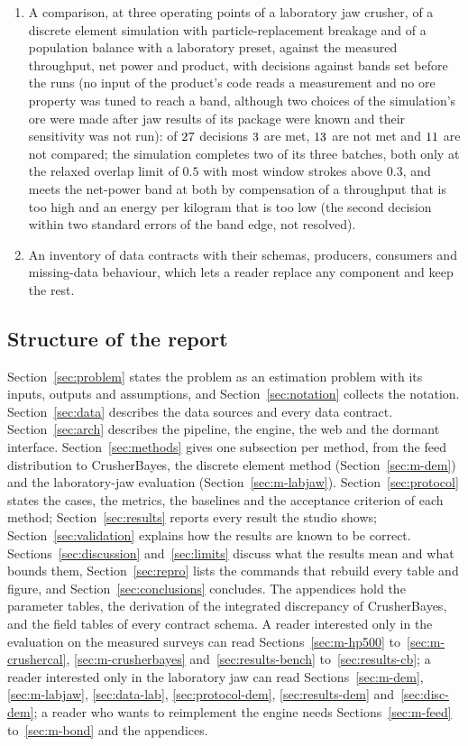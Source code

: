 \begin{enumerate}
\item A comparison, at three operating points of a laboratory jaw crusher, of a discrete element simulation with particle-replacement breakage and of a population balance with a laboratory preset, against the measured throughput, net power and product, with decisions against bands set before the runs (no input of the product's code reads a measurement and no ore property was tuned to reach a band, although two choices of the simulation's ore were made after jaw results of its package were known and their sensitivity was not run): of $27$ decisions $3$ are met, $13$ are not met and $11$ are not compared; the simulation completes two of its three batches, both only at the relaxed overlap limit of $0.5$ with most window strokes above $0.3$, and meets the net-power band at both by compensation of a throughput that is too high and an energy per kilogram that is too low (the second decision within two standard errors of the band edge, not resolved).
\item An inventory of \ncontracts{} data contracts with their schemas, producers, consumers and missing-data behaviour, which
lets a reader replace any component and keep the rest.
\end{enumerate}

\subsection{Structure of the report}\label{sec:intro-structure}

Section~\ref{sec:problem} states the problem as an estimation problem with its inputs, outputs and assumptions, and
Section~\ref{sec:notation} collects the notation. Section~\ref{sec:data} describes the data sources and every data
contract. Section~\ref{sec:arch} describes the pipeline, the engine, the web and the dormant interface. Section~\ref{sec:methods}
gives one subsection per method, from the feed distribution to CrusherBayes, the discrete element method (Section~\ref{sec:m-dem}) and the laboratory-jaw evaluation (Section~\ref{sec:m-labjaw}). Section~\ref{sec:protocol} states the cases,
the metrics, the baselines and the acceptance criterion of each method; Section~\ref{sec:results} reports every result the
studio shows; Section~\ref{sec:validation} explains how the results are known to be correct. Sections~\ref{sec:discussion}
and~\ref{sec:limits} discuss what the results mean and what bounds them, Section~\ref{sec:repro} lists the commands that
rebuild every table and figure, and Section~\ref{sec:conclusions} concludes. The appendices hold the parameter tables, the derivation
of the integrated discrepancy of CrusherBayes, and the field tables of every contract schema. A reader interested only in the evaluation
on the measured surveys can read Sections~\ref{sec:m-hp500} to~\ref{sec:m-crushercal}, \ref{sec:m-crusherbayes} and~\ref{sec:results-bench}
to~\ref{sec:results-cb}; a reader interested only in the laboratory jaw can read Sections~\ref{sec:m-dem}, \ref{sec:m-labjaw}, \ref{sec:data-lab}, \ref{sec:protocol-dem}, \ref{sec:results-dem} and~\ref{sec:disc-dem}; a reader who wants to reimplement the engine needs Sections~\ref{sec:m-feed} to~\ref{sec:m-bond} and the appendices.
